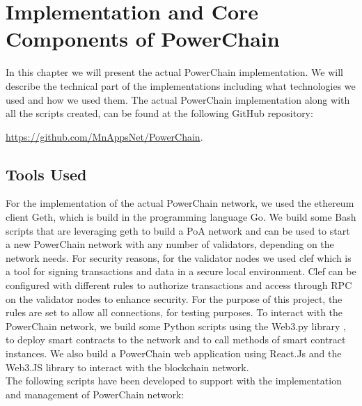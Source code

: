 \chapter{Implementation and Core Components of PowerChain} \label{platform}
In this chapter we will present the actual PowerChain implementation. We will describe the technical part of the implementations including what technologies we used and how we used them.
The actual PowerChain implementation along with all the scripts created, can be found at the following GitHub repository:
\begin{center}
    \url{https://github.com/MnAppsNet/PowerChain}.
\end{center}

\section{Tools Used}
For the implementation of the actual PowerChain network, we used the ethereum client Geth, which is build in the programming language Go.\cite{geth}
We build some Bash scripts that are leveraging geth to build a PoA network and can be used to start a new PowerChain network with any number of validators, depending on the network needs.
For security reasons, for the validator nodes we used clef \cite{clef} which is a tool for signing transactions and data in a secure local environment. Clef can be configured with different rules
to authorize transactions and access through RPC on the validator nodes to enhance security. For the purpose of this project, the rules are set to allow all connections, for testing purposes.
To interact with the PowerChain network, we build some Python scripts using the Web3.py library \cite{Web3py}, to deploy smart contracts to the network and to call methods of smart contract
instances. We also build a PowerChain web application using React.Js \cite{Reactjs} and the Web3.JS \cite{Web3js} library to interact with the blockchain network.\\
The following scripts have been developed to support with the implementation and management of PowerChain network:\\

